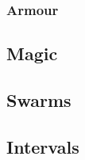 \begin{multicols}{2}
\subsubsection*{Armour}



\commonArmourChart

\mentalSkillChart

\subsubsection*{}


\subsection*{Magic}



\subsection*{Swarms}



\subsection*{Intervals}



\end{multicols}


